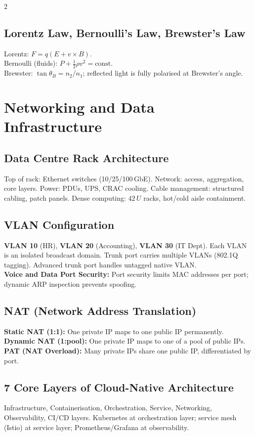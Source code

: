 \documentclass[10pt,a4paper]{article}
\begin{document}
\begin{multicols}{2}
\subsection{Lorentz Law, Bernoulli's Law, Brewster's Law}
Lorentz: $F = q(E + v\times B)$.\\
Bernoulli (fluids): $P + \frac{1}{2}\rho v^2 = \text{const}$.\\
Brewster: $\tan\theta_B = n_2/n_1$; reflected light is fully polarised at Brewster's angle.

\section{Networking and Data Infrastructure}

\subsection{Data Centre Rack Architecture}
Top of rack: Ethernet switches (10/25/100\,GbE). Network: access, aggregation, core layers. Power: PDUs, UPS, CRAC cooling. Cable management: structured cabling, patch panels. Dense computing: $42\,U$ racks, hot/cold aisle containment.

\subsection{VLAN Configuration}
\textbf{VLAN 10} (HR), \textbf{VLAN 20} (Accounting), \textbf{VLAN 30} (IT Dept). Each VLAN is an isolated broadcast domain. Trunk port carries multiple VLANs (802.1Q tagging). Advanced trunk port handles untagged native VLAN.\\
\textbf{Voice and Data Port Security:} Port security limits MAC addresses per port; dynamic ARP inspection prevents spoofing.

\subsection{NAT (Network Address Translation)}
\textbf{Static NAT (1:1):} One private IP maps to one public IP permanently.\\
\textbf{Dynamic NAT (1:pool):} One private IP maps to one of a pool of public IPs.\\
\textbf{PAT (NAT Overload):} Many private IPs share one public IP, differentiated by port.

\subsection{7 Core Layers of Cloud-Native Architecture}
Infrastructure, Containerisation, Orchestration, Service, Networking, Observability, CI/CD layers. Kubernetes at orchestration layer; service mesh (Istio) at service layer; Prometheus/Grafana at observability.

\end{multicols}
\end{document}
